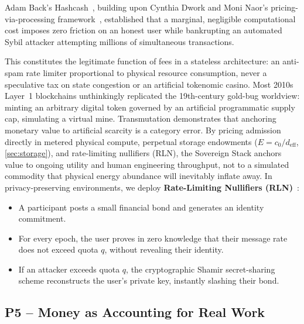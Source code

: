 \documentclass[a4paper,11pt,twoside,parskip=half-,headings=small]{scrartcl}
\begin{document}
Adam Back's Hashcash~\cite{back2002hashcash}, building upon Cynthia Dwork and Moni
Naor's pricing-via-processing framework~\cite{dwork1992}, established that a marginal,
negligible computational cost imposes zero friction on an honest user while bankrupting
an automated Sybil attacker attempting millions of simultaneous transactions.

This constitutes the legitimate function of fees in a stateless architecture:
an anti-spam rate limiter proportional to physical resource consumption, never a
speculative tax on state congestion or an artificial tokenomic casino. Most 2010s
Layer~1 blockchains unthinkingly replicated the 19th-century gold-bug worldview:
minting an arbitrary digital token governed by an artificial programmatic supply cap,
simulating a virtual mine. Transmutation demonstrates that anchoring monetary value
to artificial scarcity is a category error. By pricing admission directly in metered
physical compute, perpetual storage endowments ($E = c_0 / d_{\text{eff}}$, \cref{sec:storage}),
and rate-limiting nullifiers (RLN), the Sovereign Stack anchors value to ongoing utility
and human engineering throughput, not to a simulated commodity that physical energy
abundance will inevitably inflate away. In privacy-preserving environments, we deploy
\textbf{Rate-Limiting Nullifiers (RLN)}~\cite{rln}:
\begin{itemize}
  \item A participant posts a small financial bond and generates an identity commitment.
  \item For every epoch, the user proves in zero knowledge that their message rate
does not exceed quota $q$, without revealing their identity.
  \item If an attacker exceeds quota $q$, the cryptographic Shamir secret-sharing scheme
reconstructs the user's private key, instantly slashing their bond.
\end{itemize}

\subsection{P5 -- Money as Accounting for Real Work}
\label{sec:p5_money_accounting}
\end{document}
